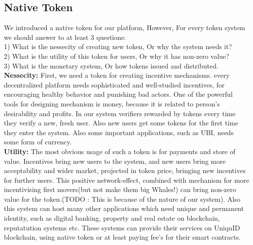 \documentclass{article}
\begin{document}
\subsection{Native Token}
We introduced a native token for our platform, However, For every  token system we should answer to at least 3 questions:
\\
1) What is the nessecity of creating new token, Or why the system needs it?
\\
2) What is the utility of this token for users, Or why it has non-zero value?
\\
3) What is the monetary system, Or how tokens issued and distributed.
\\
\textbf{Nessecity:} First, we need a token for creating incentive mechanisms. every decentralized platform needs sophisticated and well-studied incentives, for encouraging healthy behavior and punishing bad actors. One of the powerful tools for designing mechanism is money, because it is related to person's desirability and profits. In our system verifiers rewarded by tokens every time they verify a new, fresh user. Also new users get some tokens for the first time they enter the system. Also some important applications, such as UBI, needs some form of currency.
\\
\textbf{Utility:} The most obvious usage of such a token is for payments and store of value. Incentives bring new users to the system, and new users bring more acceptability and wider market, projected in token price, bringing new incentives for further users. This positive network-effect, combined with mechanism for more incentivising first movers(but not make them big Whales!) can bring non-zero value for the token.(TODO : This is because of the nature of our system). Also this system can  host  many other applications which need unique and permanent identity, such as digital banking, property and real estate on blockchain, reputatution systems etc. These systems can provide their services on UniquID blockchain, using native token or at least paying fee's for their smart contracts.
\\
\end{document}
